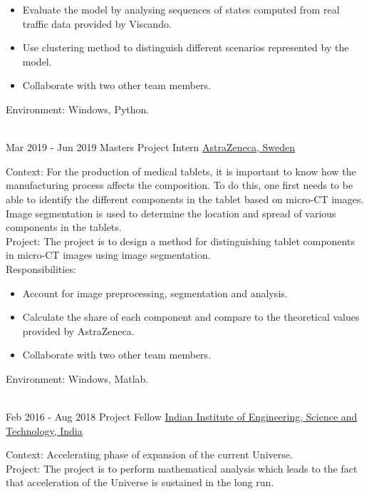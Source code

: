 \documentclass[letterpaper]{templatecv} %
\begin{document}
\begin{twenty}
\twentyitem
{}
{}
{}
{}
{}
{
\begin{itemize}
\item Evaluate the model by analysing sequences of states computed from real traffic data provided by Viscando.
\item Use clustering method to distinguish different scenarios represented by the model.
\item Collaborate with two other team members.
\end{itemize} 
Environment: Windows, Python.
   }\\
         \twentyitem
    	{Mar 2019 -}
		{Jun 2019}
        {Masters Project Intern}
        {\href{https://www.astrazeneca.com}{AstraZeneca, Sweden}}
        {}
        {Context: For the production of medical tablets, it is important to know how the manufacturing process affects the composition. To do this, one first needs to be able to identify the different components in the tablet based on micro-CT images. %
        Image segmentation is used to determine the location and spread of various components in the tablets.\\
        Project: The project is to design a method for distinguishing tablet components in micro-CT images using image segmentation. \\
Responsibilities:
\begin{itemize}
\item Account for image preprocessing, segmentation and analysis.
\item Calculate the share of each component and compare to the theoretical values provided by AstraZeneca.
\item Collaborate with two other team members.
\end{itemize} 
Environment: Windows, Matlab.
   }\\
\twentyitem
   		{Feb 2016 -}
		{Aug 2018}
        {Project Fellow}
        {\href{https://www.iiests.ac.in/}{Indian Institute of Engineering, Science and Technology, India}}
        {}
        {Context: Accelerating phase of expansion of the current Universe. \\
        Project: The project is to perform mathematical analysis which leads to the fact that acceleration of the Universe is sustained in the long run. 
        
}
\end{twenty}
\end{document}
